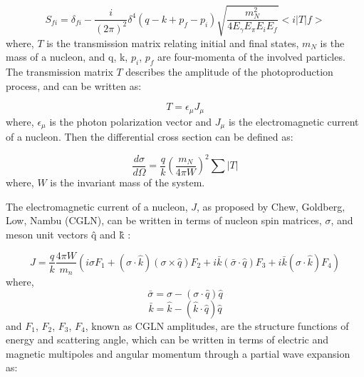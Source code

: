 \begin{equation}
S_{fi}=\delta_{fi}-\frac{i}{(2\pi)^{2}} \delta^{4}(q-k+p_{f}-p_{i}) \sqrt{\frac{m_{N}^{2}}{4E_{\gamma}E_{\pi}E_{i}E_{f} } } <i|T|f>
\end{equation}
where, $T$ is the transmission matrix relating initial and final states, $m_{N}$ is the mass of a nucleon, and q, k, $p_{i}$, $p_{f}$ are four-momenta of the involved particles. The transmission matrix $T$ describes the amplitude of the photoproduction process, and can be written as:

\begin{equation}
T=\epsilon_{\mu}J_{\mu}
\end{equation}
where, $\epsilon_{\mu}$ is the photon polarization vector and $J_{\mu}$ is the electromagnetic current of a nucleon. Then the differential cross section can be defined as:

\begin{equation}
\frac{d\sigma}{d\Omega}=\frac{q}{k}\left(\frac{m_{N}}{4\pi W}\right)^{2}\sum |T|
\end{equation}
where, $W$ is the invariant mass of the system.

\indent The electromagnetic current of a nucleon, $J$, as proposed by Chew, Goldberg, Low, Nambu (CGLN), can be written in terms of nucleon spin matrices, $\sigma$, and meson unit vectors \^q and \^k \cite{chew}:

\begin{equation}
J=\frac{q}{k}\frac{4\pi W}{m_{n}}(i\sigma F_{1}+({\sigma} \cdot \hat{k})({\sigma} \times \hat{q})F_{2}+i \bar{k}(\bar{\sigma} \cdot \hat{q})F_{3}+i\bar{k}({\sigma} \cdot \hat{k})F_{4})
\end{equation}
where,
\begin{equation}
\bar{\sigma}=\sigma-(\sigma \cdot \hat{q})\hat{q}
\end{equation}
\begin{equation}
\bar{k}=\hat{k}-(\hat{k} \cdot \hat{q})\hat{q}
\end{equation}
and $F_{1}$, $F_{2}$, $F_{3}$, $F_{4}$, known as CGLN amplitudes, are the structure functions of energy and scattering angle, which can be written in terms of electric and magnetic multipoles and angular momentum through a partial wave expansion as:

